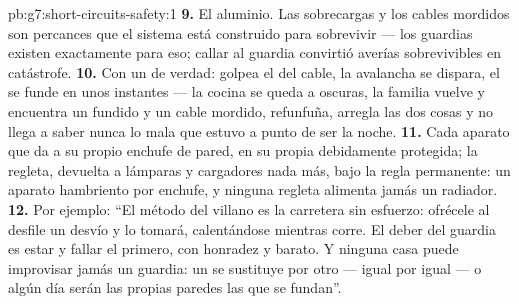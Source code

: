 \begin{solution}{pb:g7:short-circuits-safety:1}
\textbf{9.} El aluminio. Las sobrecargas y los cables mordidos son
percances que el sistema está construido para sobrevivir --- los
guardias existen exactamente para eso; callar al guardia convirtió
averías sobrevivibles en catástrofe.
\textbf{10.} Con un  de verdad: golpea el  del
cable, la avalancha se dispara, el  se funde en unos
instantes --- la cocina se queda a oscuras, la familia vuelve y
encuentra un  fundido y un cable mordido, refunfuña, arregla
las dos cosas y no llega a saber nunca lo mala que estuvo a punto de
ser la noche.
\textbf{11.} Cada aparato que da  a su propio enchufe de pared,
en su propia  debidamente protegida; la regleta, devuelta a
lámparas y cargadores nada más, bajo la regla permanente: un aparato
hambriento por enchufe, y ninguna regleta alimenta jamás un radiador.
\textbf{12.} Por ejemplo: ``El método del villano es la carretera sin
esfuerzo: ofrécele al desfile un desvío y lo tomará, calentándose
mientras corre. El deber del guardia es estar  y fallar el
primero, con honradez y barato. Y ninguna casa puede improvisar jamás
un guardia: un  se sustituye por otro  --- igual
por igual --- o algún día serán las propias paredes las que
se fundan''.
\end{solution}
